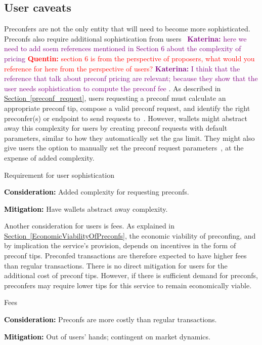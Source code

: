 \documentclass[a4paper]{article}
\theoremstyle{boldstyle}
\newlength{\entrysep}
\newcommand{\consideration}[1]{\par\noindent\textbf{\textcolor{black}{Consideration:}} #1\par\vspace{\entrysep}}
\newcommand{\mitigation}[1]{\par\noindent\textbf{\textcolor{black}{Mitigation:}} #1}
\newcommand{\qb}[1]{\textcolor{red}{\textbf{Quentin:} #1}}
\newcommand{\ks}[1]{\textcolor{purple}{\textbf{Katerina:} #1}}
\begin{document}
    \subsection{User caveats}
        Preconfers are not the only entity that will need to become more sophisticated. Preconfs also require additional sophistication from users~\cite{W:AnalysingExpectedProposerRevenuefromPreconfirmations} \ks{here we need to add soem references mentioned in Section 6 about the complexity of pricing} \qb{section 6 is from the perspective of proposers, what would you reference for here from the perspective of users?} \ks{ I think that the reference that talk about preconf pricing are relevant; because they show that the user needs sophistication to compute the preconf fee}  . As described in \hyperref[preconf_request]{Section~\ref{preconf_request}}, users requesting a preconf must calculate an appropriate preconf tip, compose a valid preconf request, and identify the right preconfer(s) or endpoint to send requests to~\cite{W:AnalyzingBFTProposer-PromisedPreconfirmations}. However, wallets might abstract away this complexity for users by creating preconf requests with default parameters, similar to how they automatically set the gas limit. They might also give users the option to manually set the preconf request parameters~\cite{W:PreconfirmationsforVanillaBasedRollups}, at the expense of added complexity. 
        \begin{considerationbox}{Requirement for user sophistication}
            \consideration{Added complexity for requesting preconfs.}
            \mitigation{Have wallets abstract away complexity.}
        \end{considerationbox}
        Another consideration for users is fees. As explained in \hyperref[EconomicViabilityOfPreconfs]{Section~\ref{EconomicViabilityOfPreconfs}}, the economic viability of preconfing, and by implication the service's provision, depends on incentives in the form of preconf tips. Preconfed transactions are therefore expected to have higher fees than regular transactions. There is no direct mitigation for users for the additional cost of preconf tips. However, if there is sufficient demand for preconfs, preconfers may require lower tips for this service to remain economically viable.
        \begin{considerationbox}{Fees}
            \consideration{Preconfs are more costly than regular transactions.}
            \mitigation{Out of users' hands; contingent on market dynamics.}
        \end{considerationbox}
       
\end{document}
